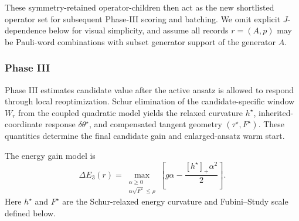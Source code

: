 \documentclass[
  reprint,
  amsmath,
  amssymb,
  aps,
  pra,
  nofootinbib,
  superscriptaddress,
  floatfix
]{revtex4-2}
\begin{document}
These symmetry-retained operator-children then act as the new shortlisted
operator set for subsequent Phase-III scoring and batching. We omit explicit
\(J\)-dependence below for visual simplicity, and assume all records
\(r=(A,p)\) may be Pauli-word combinations with subset generator support of
the generator \(A\).
\subsubsection{Phase III}
%
\noindent
Phase III estimates candidate value after the active ansatz is allowed to
respond through local reoptimization. Schur elimination of the
candidate-specific window \(W_r\) from the coupled quadratic model yields the
relaxed curvature \(h^\star\), inherited-coordinate response
\(\delta\theta^\star\), and compensated tangent geometry
\((\tau^\star,F^\star)\). These quantities determine the final
candidate gain and enlarged-ansatz warm start.

The energy gain model is
\begin{equation}
\Delta E_{3}(r)=
\max_{\substack{\alpha\ge0\\\alpha\sqrt{F^\star}\le\rho}}
\left[g\alpha-\frac{[h^\star]_+ \alpha^2}{2}\right].
\label{eq:phase3_gain}
\end{equation}
Here \(h^\star\) and \(F^\star\) are the Schur-relaxed energy curvature and
Fubini--Study scale defined below.
\end{document}
